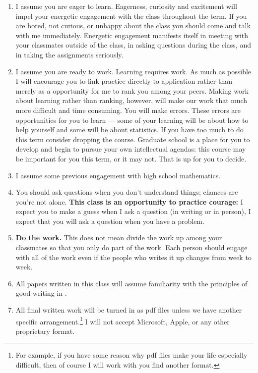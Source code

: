 \documentclass[11pt,letterpaper]{article}
\begin{document}
    \begin{enumerate}

        \item I assume you are eager to learn. Eagerness, curiosity and
            excitement will impel your energetic engagement with the class
            throughout the term. If you are bored, not curious, or unhappy
            about the class you should come and talk with me immediately.
            Energetic engagement manifests itself in meeting with your
            classmates outside of the class, in asking questions during the
            class, and in taking the assignments seriously.

        \item I assume you are ready to work. Learning requires work. As much as
            possible I will encourage you to link practice directly to application
            rather than merely as a opportunity for me to rank you among your peers.
            Making work about learning rather than ranking, however, will make our work
            that much more difficult and time consuming. You will make errors. These
            errors are opportunities for you to learn --- some of your learning will be
            about how to help yourself and some will be about statistics. If you have
            too much to do this term consider dropping the course. Graduate
            school is a place for you to develop and begin to pursue your own
            intellectual agendas: this course may be important for you this term, or it
            may not. That is up for you to decide.

        \item  I assume some previous engagement with high school mathematics.

        \item You should ask questions when you don't understand things;
            chances are you're not alone.  \textbf{This class is an opportunity
            to practice courage:} I expect you to make a guess when I ask a
            question (in writing or in person), I expect that you will ask a
            question when you have a problem.

        \item \textbf{Do the work.} This does not mean divide the work up among
            your classmates so that you only do part of the work. Each person
            should engage with all of the work even if the people who writes it
            up changes from week to week.

        \item 	All papers written in this class will assume familiarity with
            the principles of good writing in .

        \item 	All final written work will be turned in as pdf files unless we have another
            specific arrangement.\footnote{For example, if you have some reason why pdf
                files make your life especially difficult, then of course I will work with
            you find another format.} I will not accept Microsoft, Apple, or any other
            proprietary format.
    \end{enumerate}
\end{document}
